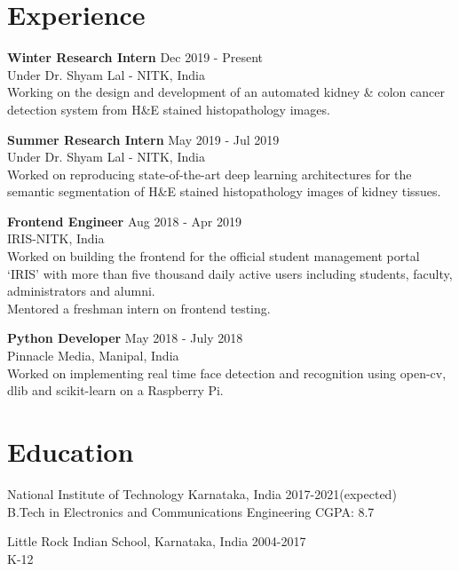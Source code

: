 \documentclass[letterpaper]{article}
\renewenvironment{itemize}{
  \begin{list}{}{
    \setlength{\leftmargin}{1.5em}
  }
}{
  \end{list}
}
\newcommand{\datefont}[1]{\textcolor{black!80}{\small{#1}}}
\begin{document}
\section*{Experience}
  \begin{itemize}
    \item \textbf{Winter Research Intern}
    \hfill{\textcolor{black!80}{\small{Dec 2019 - Present}}}\\
    \datefont{Under Dr. Shyam Lal - NITK, India}\\
    Working on the design and development of an automated kidney \& colon cancer detection system from H\&E stained histopathology images.

    \item \textbf{Summer Research Intern}
    \hfill{\textcolor{black!80}{\small{May 2019 - Jul 2019}}}\\
    \datefont{Under Dr. Shyam Lal - NITK, India}\\
    Worked on reproducing state-of-the-art deep learning architectures for the semantic segmentation of H\&E stained histopathology images of kidney tissues.

    \item \textbf{Frontend Engineer}
    \hfill{\textcolor{black!80}{\small{Aug 2018 - Apr 2019}}}\\
    \datefont{IRIS-NITK, India}\\
    Worked on building the frontend for the official student management portal `IRIS' with more than five thousand daily active users including students, faculty, administrators and alumni.\\
    Mentored a freshman intern on frontend testing.

    \item \textbf{Python Developer}
    \hfill{\textcolor{black!80}{\small{May 2018 - July 2018}}}\\
    \datefont{Pinnacle Media, Manipal, India}\\
    Worked on implementing real time face detection and recognition using open-cv, dlib and scikit-learn on a Raspberry Pi.
  \end{itemize}


\section*{Education}
  \begin{itemize}
    \item National Institute of Technology Karnataka, India\hfill
    \datefont{2017-2021(expected)}
    \\
    \datefont{B.Tech in Electronics and Communications Engineering}
    \hfill{\datefont{CGPA: 8.7}}

    \item Little Rock Indian School, Karnataka, India\hfill
    \datefont{2004-2017}
    \\
    \datefont{K-12}
  \end{itemize}
\end{document}

